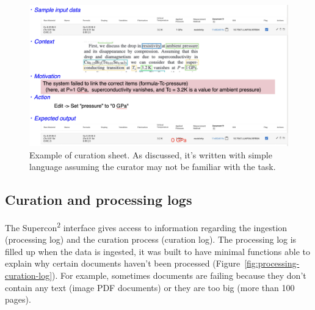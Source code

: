 \documentclass[a4paper]{article}
\begin{document}

\begin{figure}[ht]
  \centering
  \includegraphics[width=1\textwidth]{images/example-sheet-curation.png} 
  \caption{Example of curation sheet. As discussed, it's written with simple language assuming the curator may not be familiar with the task. }
  \label{fig:example-curation-sheet}
\end{figure}


\subsection{Curation and processing logs}
\label{subsec:curation-and-processing-logs}

The Supercon\textsuperscript{2} interface gives access to information regarding the ingestion (processing log) and the curation process (curation log). 
The processing log is filled up when the data is ingested, it was built to have minimal functions able to explain why certain documents haven't been processed (Figure~\ref{fig:processing-curation-log}). 
For example, sometimes documents are failing because they don't contain any text (image PDF documents) or they are too big (more than 100 pages). 
\end{document}
